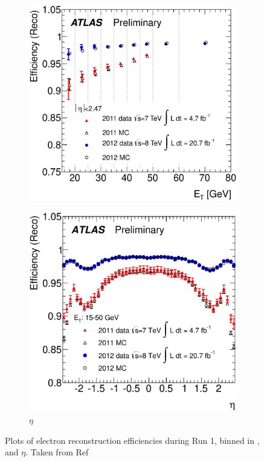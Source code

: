 \begin{figure}[h]
\begin{subfigure}{0.5\textwidth}
   \includegraphics[width=\textwidth]{figures/Reco_et.eps}
	\caption{\eT}
\end{subfigure} %
\begin{subfigure}{0.5\textwidth}
   \includegraphics[width=\textwidth]{figures/Reco_eta.eps}
	\caption{$\eta$}
\end{subfigure}
\caption{Plots of electron reconstruction efficiencies during Run 1, binned in \eT, and $\eta$. 
 Taken from Ref~\cite{Aad:2011mk}}
\label{fig:recoEff}
\end{figure}


